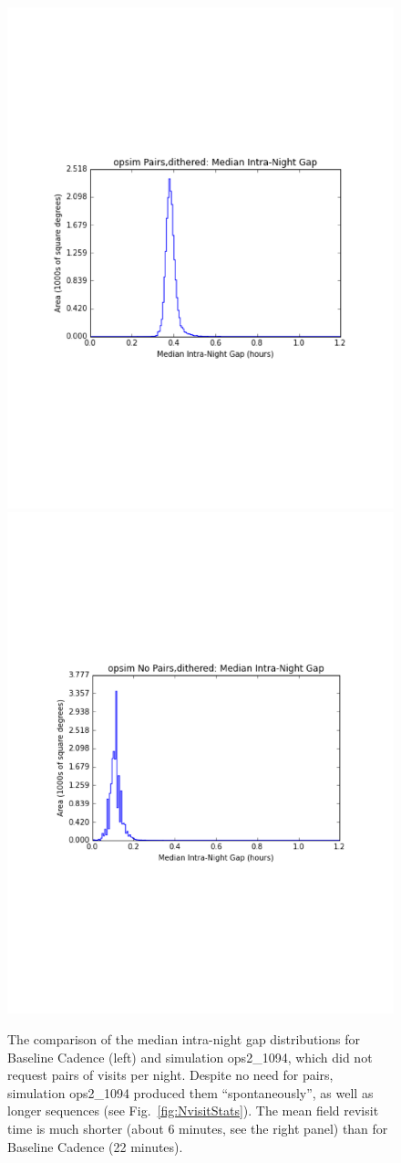 \documentclass[manuscript]{article}
\begin{document}
\begin{figure}[t!]
\vskip -1.2in
\includegraphics[angle=0,width=0.49\hsize,clip]{medinternight1.pdf}
\includegraphics[angle=0,width=0.49\hsize,clip]{medinternight2.pdf}
\vskip -1.3in
\caption{
The comparison of the median intra-night gap distributions for Baseline Cadence (left) 
and simulation ops2\_1094, which did not request pairs of visits per night.
Despite no need for pairs, simulation ops2\_1094 produced them ``spontaneously'', 
as well as longer sequences (see Fig.~\ref{fig:NvisitStats}). The mean field revisit 
time is much shorter (about 6 minutes, see the right panel) than for Baseline Cadence
(22 minutes).} 
\label{fig:intranightgapCompare}
\end{figure}
\end{document}

